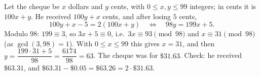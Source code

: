 Let the cheque be $x$ dollars and $y$ cents, with $0\le x,y\le99$ integers; in cents it is $100x+y$. He received $100y+x$ cents, and after losing $5$ cents,
\[
100y+x-5=2(100x+y)\quad\Longleftrightarrow\quad 98y=199x+5 .
\]
Modulo $98$: $199\equiv3$, so $3x+5\equiv0$, i.e.\ $3x\equiv93\pmod{98}$ and $x\equiv31\pmod{98}$ (as $\gcd(3,98)=1$). With $0\le x\le99$ this gives $x=31$, and then $y=\dfrac{199\cdot31+5}{98}=\dfrac{6174}{98}=63$. The cheque was for $\boxed{\$31.63}$. Check: he received $\$63.31$, and $\$63.31-\$0.05=\$63.26=2\cdot\$31.63$.
